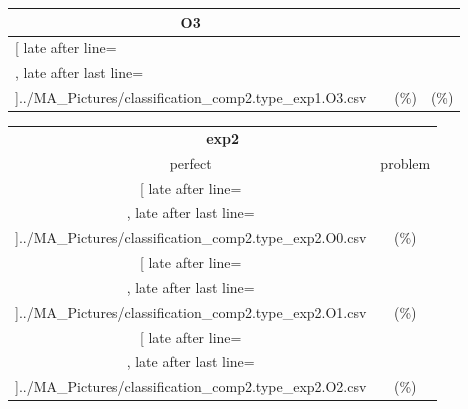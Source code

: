 \begin{table}[!htbp]
{\begin{tabular}{l|c|c|c}
\multicolumn{1}{c}{\bfseries O3}
	\\\midrule
	\csvreader[ late after line=\\, late after last line=\\\bottomrule]{../MA_Pictures/classification_comp2.type_exp1.O3.csv}{
}
	{\csvcolii  &  \csvcoliii & \csvcoliv (\csvcolv \%) & \csvcolvi (\csvcolvii\%)}%


    	\end{tabular}

	\begin{tabular}{|c|c}%

	\toprule
    \multicolumn{2}{c}{\bfseries exp2}\\
	
	     perfect &  problem %
	\\\midrule
	\csvreader[ late after line=\\, late after last line=\\\midrule]{../MA_Pictures/classification_comp2.type_exp2.O0.csv}{
}
	{\csvcoliv (\csvcolv \%) & \csvcolvi (\csvcolvii\%)}%
\multicolumn{1}{c}{}

	\\\midrule
	\csvreader[ late after line=\\, late after last line=\\\midrule]{../MA_Pictures/classification_comp2.type_exp2.O1.csv}{
}
	{\csvcoliv (\csvcolv \%) & \csvcolvi (\csvcolvii\%)}%
	
	\multicolumn{1}{c}{}

	\\\midrule
	\csvreader[ late after line=\\, late after last line=\\\midrule]{../MA_Pictures/classification_comp2.type_exp2.O2.csv}{
}
	{\csvcoliv (\csvcolv \%) & \csvcolvi (\csvcolvii\%)}%
	

\end{tabular}}
\end{table}
